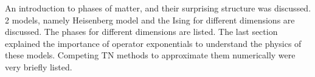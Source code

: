 An introduction to phases of matter, and their surprising structure was discussed. 2 models, namely Heisenberg model and the Ising for different dimensions are discussed. The phases for different dimensions are listed. The last section explained the importance of operator exponentials to understand the physics of these models. Competing \Gls{TN} methods to approximate them numerically were very briefly listed.